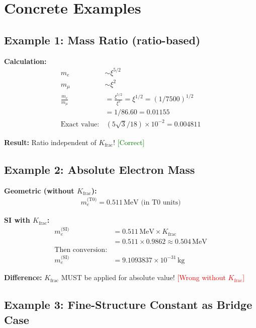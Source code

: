 \documentclass[12pt,a4paper]{article}
\begin{document}
	\section{Concrete Examples}
	
	\subsection{Example 1: Mass Ratio (ratio-based)}
	
	\textbf{Calculation:}
	\begin{align*}
		m_e &\sim \xi^{5/2} \\
		m_μ &\sim \xi^2 \\
		\frac{m_e}{m_μ} &= \frac{\xi^{5/2}}{\xi^2} = \xi^{1/2} = (1/7500)^{1/2} \\
		&= 1/86.60 = 0.01155 \\
		\text{Exact value:} &\, (5\sqrt{3}/18) \times 10^{-2} = 0.004811
	\end{align*}
	
	\textbf{Result:} Ratio independent of $K_{\text{frac}}$! \textcolor{green}{[Correct]}
	
	\subsection{Example 2: Absolute Electron Mass}
	
	\textbf{Geometric (without $K_{\text{frac}}$):}
	\begin{align*}
		m_e^{\text{(T0)}} = 0.511\,\text{MeV (in T0 units)}
	\end{align*}
	
	\textbf{SI with $K_{\text{frac}}$:}
	\begin{align*}
		m_e^{\text{(SI)}} &= 0.511\,\text{MeV} \times K_{\text{frac}} \\
		&= 0.511 \times 0.9862 \approx 0.504\,\text{MeV} \\
		\text{Then conversion:} & \\
		m_e^{\text{(SI)}} &= 9.1093837 \times 10^{-31}\,\text{kg}
	\end{align*}
	
	\textbf{Difference:} $K_{\text{frac}}$ MUST be applied for absolute value! \textcolor{red}{[Wrong without $K_{\text{frac}}$]}
	
	\subsection{Example 3: Fine-Structure Constant as Bridge Case}
	
\end{document}
